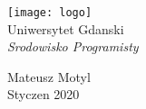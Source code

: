 \begin{titlepage}
    \begin{center}

        \texttt{[image: logo]}\\
        {\huge{Uniwersytet Gdanski}}\\
        \textit{\huge{Srodowisko Programisty}}

        \vfill
        {\large Mateusz Motyl}\\
        Styczen 2020
        
    \end{center}
\end{titlepage}